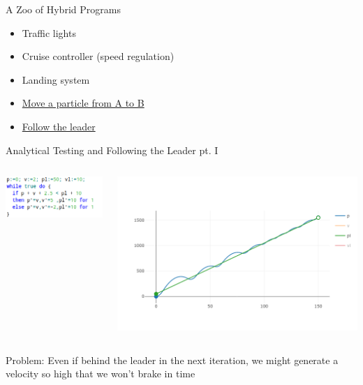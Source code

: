 \documentclass{beamer}
\begin{document}
\begin{frame}{A Zoo of Hybrid Programs}

        \begin{itemize}

                \item Traffic lights

                \item Cruise controller (speed regulation)

                \item Landing system

                \item \underline{Move a particle from A to B}

                \item \underline{Follow the leader}
        \end{itemize}

\end{frame} 
\begin{frame}{Analytical Testing and Following the Leader pt. I}
  \begin{minipage}[0.3\textheight]{\textwidth}
  \begin{columns}[c]
  \begin{column}{0.45\textwidth}
   \hspace{0.3cm}
   \includegraphics[scale=0.38]{./images/fl1.png}
  \end{column}
  \begin{column}{1\textwidth}
    \includegraphics[scale=0.3]{./images/fl_plot.png}
  \end{column}
  \end{columns}
  \end{minipage}

  \pause
  Problem: Even if behind the leader in the next iteration, we might
  generate a velocity so high that we won't brake in time
\end{frame}
\end{document}
